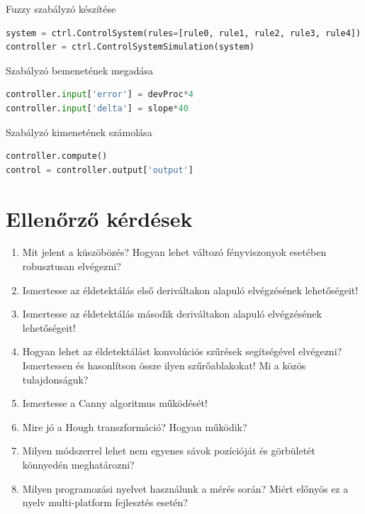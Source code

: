 \documentclass[12pt,a4paper,oneside]{report}             %
\begin{document}
Fuzzy szabályzó készítése

\begin{lstlisting}[language=Python]
system = ctrl.ControlSystem(rules=[rule0, rule1, rule2, rule3, rule4])
controller = ctrl.ControlSystemSimulation(system)
\end{lstlisting}

Szabályzó bemenetének megadása

\begin{lstlisting}[language=Python]
controller.input['error'] = devProc*4
controller.input['delta'] = slope*40
\end{lstlisting}

Szabályzó kimenetének számolása

\begin{lstlisting}[language=Python]
controller.compute()
control = controller.output['output']
\end{lstlisting}

\chapter{Ellenőrző kérdések}

\begin{enumerate}
\item Mit jelent a küszöbözés? Hogyan lehet változó fényviszonyok esetében robusztusan elvégezni?
\item Ismertesse az éldetektálás első deriváltakon alapuló elvégzésének lehetőségeit!
\item Ismertesse az éldetektálás második deriváltakon alapuló elvégzésének lehetőségeit!
\item Hogyan lehet az éldetektálást konvolúciós szűrések segítségével elvégezni? Ismertessen és hasonlítson össze ilyen szűrőablakokat! Mi a közös tulajdonságuk?
\item Ismertesse a Canny algoritmus működését!
\item Mire jó a Hough transzformáció? Hogyan működik?
\item Milyen módszerrel lehet nem egyenes sávok pozícióját és görbületét könnyedén meghatározni?
\item Milyen programozási nyelvet használunk a mérés során? Miért előnyös ez a nyelv multi-platform fejlesztés esetén?
\end{enumerate}

\printbibliography
\end{document}
